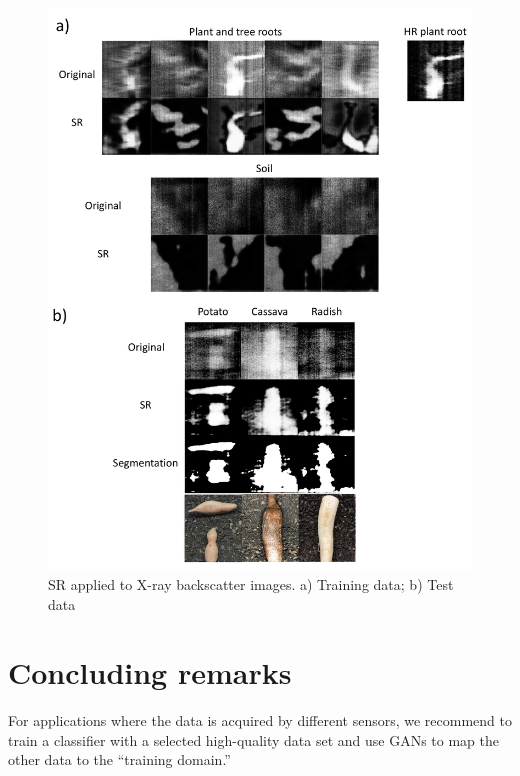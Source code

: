 \documentclass[10pt,twocolumn,letterpaper]{article}
\begin{document}
\begin{figure}[h]
\begin{center}
\includegraphics[scale=0.70]{results/srxray.pdf}
\end{center}
   \caption{SR applied to X-ray backscatter images. a) Training data; b) Test data}
\label{fig:srtest}
\end{figure}

\section{Concluding remarks}
\label{sec:conclusion}

For applications where the data is acquired by different sensors, we recommend to train a classifier with a selected high-quality data set and use GANs to map the other data to the ``training domain.''


{\small


}
\end{document}
